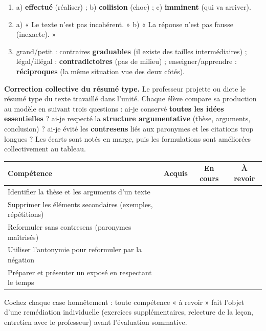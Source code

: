 \documentclass[11pt]{article}
\newcounter{popsec}
\newcounter{popsub}
\newcommand{\courssub}[1]{%
  \stepcounter{popsub}%
  \par\vspace{9pt}\noindent{\popxbold\fontsize{11.5}{13}\selectfont\color{popink}{\color{poporange}\thepopsec.\thepopsub}\hspace{6pt}#1}\par\nopagebreak\vspace{4pt}
}
\begin{document}
\begin{corrige}
\begin{enumerate}
\item a) \textbf{effectué} (réaliser) ; b) \textbf{collision} (choc) ; c) \textbf{imminent} (qui va arriver).
\item a) « Le texte n'est pas incohérent. » b) « La réponse n'est pas fausse (inexacte). »
\item grand/petit : contraires \textbf{graduables} (il existe des tailles intermédiaires) ; légal/illégal : \textbf{contradictoires} (pas de milieu) ; enseigner/apprendre : \textbf{réciproques} (la même situation vue des deux côtés).
\end{enumerate}
\end{corrige}

\courssub{Compte-rendu et remédiation}

\textbf{Correction collective du résumé type.} Le professeur projette ou dicte le résumé type du texte travaillé dans l'unité. Chaque élève compare sa production au modèle en suivant trois questions : ai-je conservé \textbf{toutes les idées essentielles} ? ai-je respecté la \textbf{structure argumentative} (thèse, arguments, conclusion) ? ai-je évité les \textbf{contresens} liés aux paronymes et les citations trop longues ? Les écarts sont notés en marge, puis les formulations sont améliorées collectivement au tableau.

\begin{aretenir}
\begin{center}
\begin{tabularx}{\linewidth}{|X|c|c|c|}
\hline
\rowcolor{popblueL} \textbf{Compétence} & \textbf{Acquis} & \textbf{En cours} & \textbf{À revoir} \\
\hline
Identifier la thèse et les arguments d'un texte & & & \\
\hline
Supprimer les éléments secondaires (exemples, répétitions) & & & \\
\hline
Reformuler sans contresens (paronymes maîtrisés) & & & \\
\hline
Utiliser l'antonymie pour reformuler par la négation & & & \\
\hline
Préparer et présenter un exposé en respectant le temps & & & \\
\hline
\end{tabularx}
\end{center}
Cochez chaque case honnêtement : toute compétence « à revoir » fait l'objet d'une remédiation individuelle (exercices supplémentaires, relecture de la leçon, entretien avec le professeur) avant l'évaluation sommative.
\end{aretenir}
\end{document}
